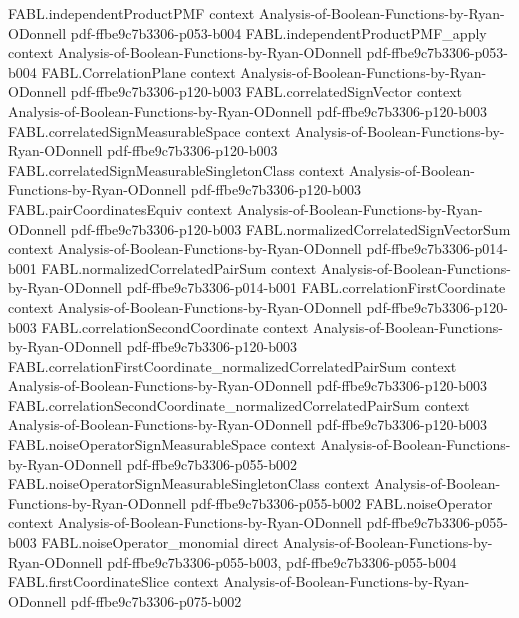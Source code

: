 \begin{theorem}
\proofstep
  {FABL.independentProductPMF}
  {context}
  {Analysis-of-Boolean-Functions-by-Ryan-ODonnell}
  {pdf-ffbe9c7b3306-p053-b004}
\proofstep
  {FABL.independentProductPMF_apply}
  {context}
  {Analysis-of-Boolean-Functions-by-Ryan-ODonnell}
  {pdf-ffbe9c7b3306-p053-b004}
\proofstep
  {FABL.CorrelationPlane}
  {context}
  {Analysis-of-Boolean-Functions-by-Ryan-ODonnell}
  {pdf-ffbe9c7b3306-p120-b003}
\proofstep
  {FABL.correlatedSignVector}
  {context}
  {Analysis-of-Boolean-Functions-by-Ryan-ODonnell}
  {pdf-ffbe9c7b3306-p120-b003}
\proofstep
  {FABL.correlatedSignMeasurableSpace}
  {context}
  {Analysis-of-Boolean-Functions-by-Ryan-ODonnell}
  {pdf-ffbe9c7b3306-p120-b003}
\proofstep
  {FABL.correlatedSignMeasurableSingletonClass}
  {context}
  {Analysis-of-Boolean-Functions-by-Ryan-ODonnell}
  {pdf-ffbe9c7b3306-p120-b003}
\proofstep
  {FABL.pairCoordinatesEquiv}
  {context}
  {Analysis-of-Boolean-Functions-by-Ryan-ODonnell}
  {pdf-ffbe9c7b3306-p120-b003}
\proofstep
  {FABL.normalizedCorrelatedSignVectorSum}
  {context}
  {Analysis-of-Boolean-Functions-by-Ryan-ODonnell}
  {pdf-ffbe9c7b3306-p014-b001}
\proofstep
  {FABL.normalizedCorrelatedPairSum}
  {context}
  {Analysis-of-Boolean-Functions-by-Ryan-ODonnell}
  {pdf-ffbe9c7b3306-p014-b001}
\proofstep
  {FABL.correlationFirstCoordinate}
  {context}
  {Analysis-of-Boolean-Functions-by-Ryan-ODonnell}
  {pdf-ffbe9c7b3306-p120-b003}
\proofstep
  {FABL.correlationSecondCoordinate}
  {context}
  {Analysis-of-Boolean-Functions-by-Ryan-ODonnell}
  {pdf-ffbe9c7b3306-p120-b003}
\proofstep
  {FABL.correlationFirstCoordinate_normalizedCorrelatedPairSum}
  {context}
  {Analysis-of-Boolean-Functions-by-Ryan-ODonnell}
  {pdf-ffbe9c7b3306-p120-b003}
\proofstep
  {FABL.correlationSecondCoordinate_normalizedCorrelatedPairSum}
  {context}
  {Analysis-of-Boolean-Functions-by-Ryan-ODonnell}
  {pdf-ffbe9c7b3306-p120-b003}
\proofstep
  {FABL.noiseOperatorSignMeasurableSpace}
  {context}
  {Analysis-of-Boolean-Functions-by-Ryan-ODonnell}
  {pdf-ffbe9c7b3306-p055-b002}
\proofstep
  {FABL.noiseOperatorSignMeasurableSingletonClass}
  {context}
  {Analysis-of-Boolean-Functions-by-Ryan-ODonnell}
  {pdf-ffbe9c7b3306-p055-b002}
\proofstep
  {FABL.noiseOperator}
  {context}
  {Analysis-of-Boolean-Functions-by-Ryan-ODonnell}
  {pdf-ffbe9c7b3306-p055-b003}
\proofstep
  {FABL.noiseOperator_monomial}
  {direct}
  {Analysis-of-Boolean-Functions-by-Ryan-ODonnell}
  {pdf-ffbe9c7b3306-p055-b003,
    pdf-ffbe9c7b3306-p055-b004}
\proofstep
  {FABL.firstCoordinateSlice}
  {context}
  {Analysis-of-Boolean-Functions-by-Ryan-ODonnell}
  {pdf-ffbe9c7b3306-p075-b002}

\end{theorem}
